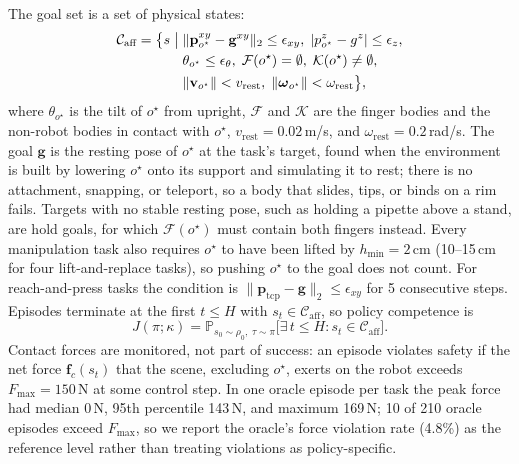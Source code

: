 \documentclass[conference]{IEEEtran}
\begin{document}
The goal set is a set of physical states:
\begin{align}
\mathcal{C}_{\text{aff}} = \big\{ s \;\big|\; & \|\mathbf{p}^{xy}_{o^\star} - \mathbf{g}^{xy}\|_2 \le \epsilon_{xy},\; |p^{z}_{o^\star} - g^{z}| \le \epsilon_z, \notag \\
& \theta_{o^\star} \le \epsilon_\theta,\; \mathcal{F}(o^\star) = \emptyset,\; \mathcal{K}(o^\star) \neq \emptyset, \notag \\
& \|\mathbf{v}_{o^\star}\| < v_{\text{rest}},\; \|\boldsymbol{\omega}_{o^\star}\| < \omega_{\text{rest}} \big\},
\end{align}
where $\theta_{o^\star}$ is the tilt of $o^\star$ from upright, $\mathcal{F}$ and $\mathcal{K}$ are the finger bodies and the non-robot bodies in contact with $o^\star$, $v_{\text{rest}} = 0.02$\,m/s, and $\omega_{\text{rest}} = 0.2$\,rad/s. The goal $\mathbf{g}$ is the resting pose of $o^\star$ at the task's target, found when the environment is built by lowering $o^\star$ onto its support and simulating it to rest; there is no attachment, snapping, or teleport, so a body that slides, tips, or binds on a rim fails. Targets with no stable resting pose, such as holding a pipette above a stand, are hold goals, for which $\mathcal{F}(o^\star)$ must contain both fingers instead. Every manipulation task also requires $o^\star$ to have been lifted by $h_{\min} = 2$\,cm (10--15\,cm for four lift-and-replace tasks), so pushing $o^\star$ to the goal does not count. For reach-and-press tasks the condition is $\|\mathbf{p}_{\text{tcp}} - \mathbf{g}\|_2 \le \epsilon_{xy}$ for 5 consecutive steps. Episodes terminate at the first $t \le H$ with $s_t \in \mathcal{C}_{\text{aff}}$, so policy competence is
\begin{equation}
J(\pi; \kappa) = \mathbb{P}_{s_0 \sim \rho_0,\; \tau \sim \pi}\big[\exists\, t \le H : s_t \in \mathcal{C}_{\text{aff}}\big].
\end{equation}
Contact forces are monitored, not part of success: an episode violates safety if the net force $\mathbf{f}_c(s_t)$ that the scene, excluding $o^\star$, exerts on the robot exceeds $F_{\max} = 150$\,N at some control step. In one oracle episode per task the peak force had median 0\,N, 95th percentile 143\,N, and maximum 169\,N; 10 of 210 oracle episodes exceed $F_{\max}$, so we report the oracle's force violation rate (4.8\%) as the reference level rather than treating violations as policy-specific.
\end{document}
